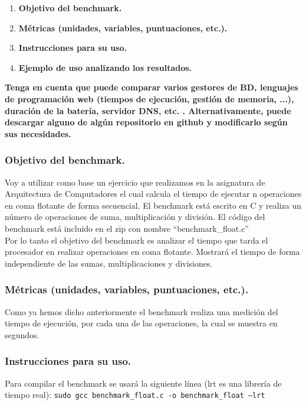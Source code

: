 \begin{enumerate}
	\item \textbf{Objetivo del benchmark.}
	\item \textbf{Métricas (unidades, variables, puntuaciones, etc.).}
	\item \textbf{Instrucciones para su uso.}
	\item \textbf{Ejemplo de uso analizando los resultados.}
\end{enumerate}

\textbf{Tenga en cuenta que puede comparar varios gestores de BD, lenguajes de programación web (tiempos de ejecución, gestión de memoria, ...), duración de la batería, servidor DNS, etc. . Alternativamente, puede descargar alguno de algún repositorio en github y modificarlo según sus necesidades.}\\

\subsubsection{Objetivo del benchmark.} 
Voy a utilizar como base un ejercicio que realizamos en la asignatura de Arquitectura de Computadores el cual calcula el tiempo de ejecutar n operaciones en coma flotante de forma secuencial. El benchmark está escrito en C y realiza un número de operaciones de suma, multiplicación y división. El código del benchmark está incluido en el zip con nombre ``benchmark\_float.c''\\

Por lo tanto el objetivo del benchmark es analizar el tiempo que tarda el procesador en realizar operaciones en coma flotante. Mostrará el tiempo de forma independiente de las sumas, multiplicaciones y divisiones.


\subsubsection{Métricas (unidades, variables, puntuaciones, etc.).}
Como ya hemos dicho anteriormente el benchmark realiza una medición del tiempo de ejecución, por cada una de las operaciones, la cual se muestra en segundos.

\subsubsection{Instrucciones para su uso.}
Para compilar el benchmark se usará la siguiente línea (lrt es una librería de tiempo real): 
\texttt{sudo gcc benchmark\_float.c -o benchmark\_float –lrt}\\

